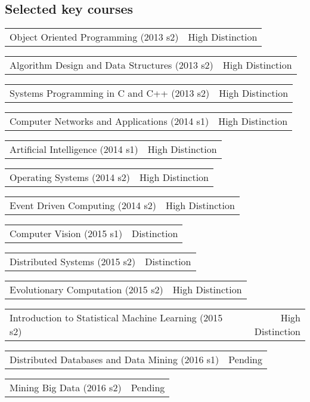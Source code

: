\documentclass[10pt,letterpaper]{article}
\makeatletter
\newcommand{\headerrow}[2]
{\begin{tabular*}{\linewidth}{l@{\extracolsep{\fill}}r}
  #1 &
  #2 \\
\end{tabular*}}
\makeatother
\begin{document}
  \subsection*{Selected key courses}
  \begin{itemize*}
    \item \headerrow
      {Object Oriented Programming (2013 s2)}
      {High Distinction}
    \item \headerrow
      {Algorithm Design and Data Structures (2013 s2)}
      {High Distinction}
    \item \headerrow
      {Systems Programming in C and C++ (2013 s2)}
      {High Distinction}
    \item \headerrow
      {Computer Networks and Applications (2014 s1)}
      {High Distinction}
    \item \headerrow
      {Artificial Intelligence (2014 s1)}
      {High Distinction}
    \item \headerrow
      {Operating Systems (2014 s2)}
      {High Distinction}
    \item \headerrow
      {Event Driven Computing (2014 s2)}
      {High Distinction}
    \item \headerrow
      {Computer Vision (2015 s1)}
      {Distinction}
    \item \headerrow
      {Distributed Systems (2015 s2)}
      {Distinction}
    \item \headerrow
      {Evolutionary Computation (2015 s2)}
      {High Distinction}
    \item \headerrow
      {Introduction to Statistical Machine Learning (2015 s2)}
      {High Distinction}
    \item \headerrow
      {Distributed Databases and Data Mining (2016 s1)}
      {Pending}
    \item \headerrow
      {Mining Big Data (2016 s2)}
      {Pending}
  \end{itemize*}
\end{document}
